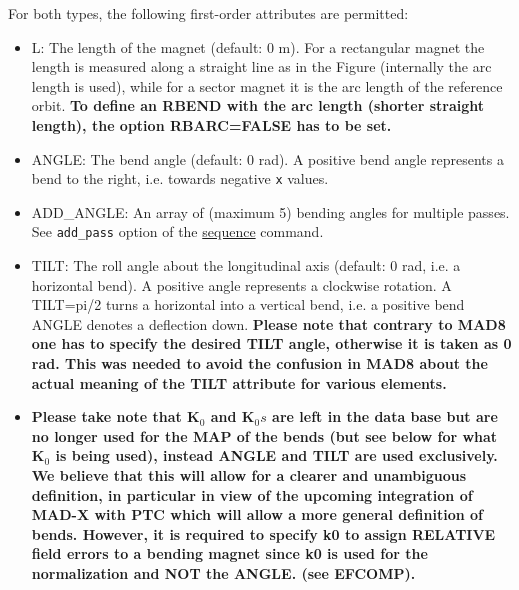 For both types, the following first-order attributes are permitted: 
\begin{itemize}
   \item L: The length of the magnet (default: 0 m). For a rectangular
     magnet the length is measured along a straight line  as in the
     Figure (internally the arc length is used), while for a  sector
     magnet it is the arc length of the reference orbit. \textbf{ To
       define an RBEND with the arc length (shorter straight length),
       the option RBARC=FALSE has to be set.} 

   \item ANGLE: The bend angle (default: 0 rad). A positive bend angle
     represents a bend to the right, i.e. towards negative \texttt{x}
     values.  
   
   \item ADD\_ANGLE: An array of (maximum 5) bending angles for multiple
     passes. See \texttt{add\_pass} option of the
     \href{sequence.html}{sequence} command.  

   \item TILT: The roll angle about the longitudinal axis (default: 0
     rad, i.e. a horizontal bend). A positive angle represents a
     clockwise rotation. A TILT=pi/2 turns a horizontal into a vertical
     bend, i.e. a positive bend ANGLE denotes a deflection
     down. \textbf{ Please note that contrary to MAD8 one has to specify
       the desired TILT angle, otherwise it is taken as 0 rad. This was
       needed to avoid the confusion in MAD8 about the actual meaning of
       the TILT attribute for various elements. } 

   \item \textbf{Please take note that K$_0$ and K$_0s$ are left in the
     data base but are no longer used for the MAP of the bends (but see
     below for what K$_0$ is being used), instead ANGLE and TILT are
     used exclusively. We believe that this will allow for a clearer and
     unambiguous definition, in particular in view of the upcoming
     integration of MAD-X with PTC which will allow a more general
     definition of bends.  However, it is required to specify k0 to
     assign RELATIVE field errors to a bending magnet since k0 is used
     for the normalization and NOT the ANGLE. (see EFCOMP).} 




\end{itemize}
